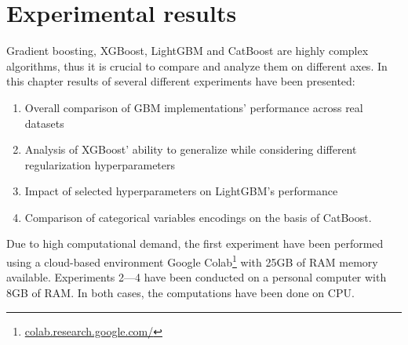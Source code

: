 \documentclass[magisterska, english]{pwr_wmat_praca_dyplomowa}
\theoremstyle{plain}
\numberwithin{theorem}{chapter}
\theoremstyle{definition}
\numberwithin{theorem}{chapter}
\begin{document}
\chapter{Experimental results}\label{chapter:results}
Gradient boosting, XGBoost, LightGBM and CatBoost are highly complex algorithms, thus it is crucial to compare and analyze them on different axes. In this chapter results of several different experiments have been presented:
\begin{enumerate}
    \item Overall comparison of GBM implementations' performance across real datasets
    \item Analysis of XGBoost' ability to generalize while considering different regularization hyperparameters
    \item Impact of selected hyperparameters on LightGBM's performance
    \item Comparison of categorical variables encodings on the basis of CatBoost.
\end{enumerate}
Due to high computational demand, the first experiment have been performed using a cloud-based environment Google Colab\footnote{\url{colab.research.google.com/}} with 25GB of RAM memory available. Experiments 2---4 have been conducted on a personal computer with 8GB of RAM. In both cases, the computations have been done on CPU.
\end{document}
